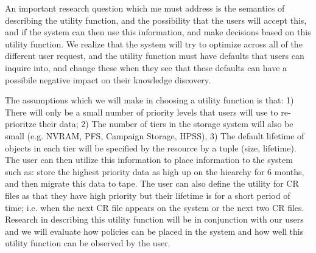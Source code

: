 An important research question which me must address is the semantics of
describing the utility function, and the possibility that the users will
accept this, and if the system can then use this information, and make 
decisions based on this utility function. We realize that the system will
try to optimize across all of the different user request, and the utility
function must have defaults that users can inquire into, and change these
when they see that these defaults can have a possibile negative impact on
their knowledge discovery. 

The assumptions which we will make in choosing a utility function is that:
1) There will only be a small number of priority levels that users will use
to re-prioritze their data; 2) The number of tiers in the storage system will
also be small (e.g. NVRAM, PFS, Campaign Storage, HPSS), 3) The default
lifetime of objects in each tier will be specified by the resource by
a tuple (size, lifetime).  The user can then utilize this information to
place information to the system such as: store the highest priority data
as high up on the hiearchy for 6 months, and then migrate this data to tape.
The user can also define the utility for CR files as that they have high
priority but their lifetime is for a short period of time; i.e. when the
next CR file appears on the system or the next two CR files. Research in
describing this utility function will be in conjunction with our users
and we will evaluate how policies can be placed in the system and how well
this utility function can be observed by the user.


